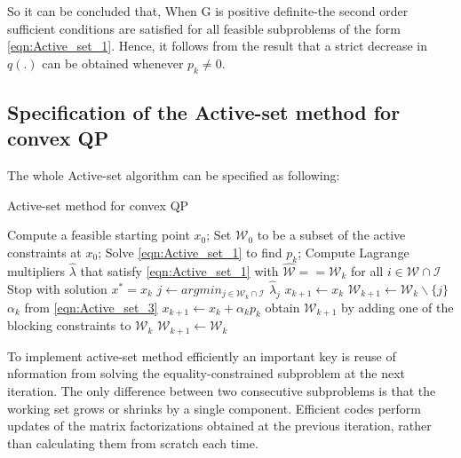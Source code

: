 So it can be concluded that, When G is positive definite-the second order sufficient conditions are satisfied for all feasible subproblems of the form \ref{eqn:Active_set_1}. Hence, it follows from the result that a strict decrease in $q(.)$ can be obtained whenever $p_k \neq 0$.

\subsection*{Specification of the Active-set method for convex QP}
The whole Active-set algorithm can be specified as following:
\begin{algorithm}[h]
  \caption{Active-set method for convex QP}\label{euclid}
  \begin{algorithmic}[1]
      \State Compute a feasible starting point $x_0$;
      \State Set $\mathcal{W}_0$ to be a subset of the active constraints at $x_0$;
        \State Solve \ref{eqn:Active_set_1} to find $p_k$;
          \State Compute Lagrange multipliers $\hat{\lambda}$ that satisfy \ref{eqn:Active_set_1} with $\hat{\mathcal{W}}==\mathcal{W}_k$
           for all $i \in \mathcal{W}\cap \mathcal{I}$
          	\State Stop with solution $x^* = x_k$
          \Else
          	\State $j \gets argmin_{j\in \mathcal{W}_k \cap \mathcal{I}}$ $\hat{\lambda}_j$
          	\State $x_{k+1} \gets x_k$
          	\State $\mathcal{W}_{k+1} \gets \mathcal{W}_k\backslash \lbrace{j \rbrace}$
          \EndIf 
        \Else
          \State $\alpha_k$ from \ref{eqn:Active_set_3}
          \State $x_{k+1} \gets x_k + \alpha_kp_k$
          	\State obtain $\mathcal{W}_{k+1}$ by adding one of the blocking constraints to $\mathcal{W}_k$
          \Else
          	\State $\mathcal{W}_{k+1} \gets \mathcal{W}_k$  
          \EndIf
        \EndIf
      \EndFor
    \EndProcedure
  \end{algorithmic}
\end{algorithm}

To implement active-set method efficiently an important key is reuse of nformation from solving the equality-constrained subproblem at the next iteration. The only difference between two consecutive subproblems is that the working set grows or shrinks by a single component. Efficient codes perform updates of the matrix factorizations obtained at the previous iteration, rather than calculating them from scratch each time.




